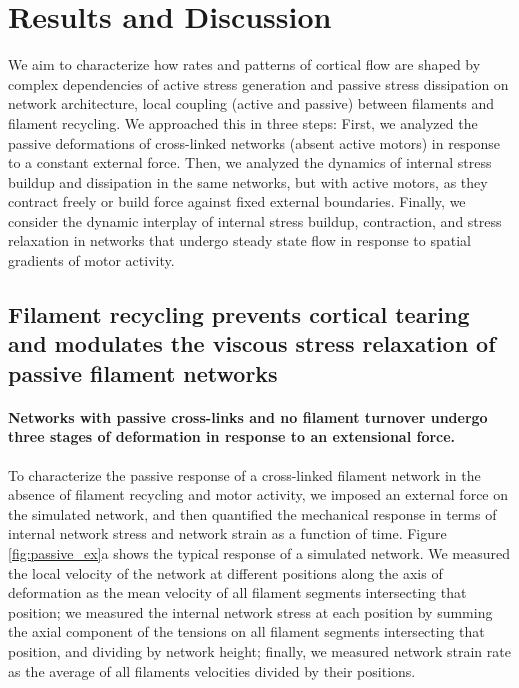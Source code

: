 \documentclass[10pt,letterpaper]{article}
\begin{document}
\section*{Results and Discussion}
We aim to characterize how rates and patterns of cortical flow are shaped by complex dependencies of active stress generation and passive stress dissipation on network architecture, local coupling (active and passive) between filaments and filament recycling.  We approached this in three steps: First, we analyzed the passive deformations of cross-linked networks (absent active motors) in response to a constant external force. Then, we analyzed the dynamics of internal stress buildup and dissipation in the same networks, but with active motors, as they contract freely or build force against fixed external boundaries. Finally, we consider the dynamic interplay of internal stress buildup, contraction, and stress relaxation in networks that undergo steady state flow in response to spatial gradients of motor activity.

\subsection*{Filament recycling prevents cortical tearing and modulates the viscous stress relaxation of passive filament networks}
 
\paragraph{Networks with passive cross-links and no filament turnover undergo three stages of deformation in response to an extensional force.} 

To characterize the passive response of a cross-linked filament network in the absence of filament recycling and motor activity, we imposed an external force on the simulated network, and then quantified the mechanical response in terms of internal network stress and network strain as a function of time. Figure \ref{fig:passive_ex}a shows the typical response of a simulated network. We measured the local velocity of the network at different positions along the axis of deformation as the mean velocity of all filament segments intersecting that position; we measured the internal network stress at each position by summing the axial component of the tensions on all filament segments intersecting that position, and dividing by network height; finally, we measured network strain rate as the average of all filaments velocities divided by their positions.
\end{document}
